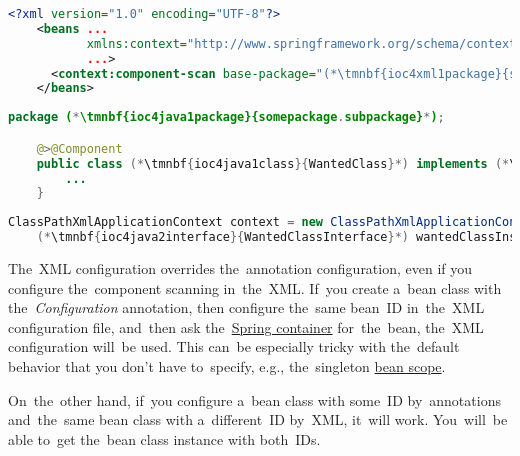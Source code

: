 \begin{lstlisting}[language=XML, title={Configuration XML}]
    <?xml version="1.0" encoding="UTF-8"?>
    <beans ...
           xmlns:context="http://www.springframework.org/schema/context"
           ...>
      <context:component-scan base-package="(*\tmnbf{ioc4xml1package}{somepackage.subpackage}[ForestGreen]*)"/>
    </beans>
\end{lstlisting}
\begin{lstlisting}[language=Java, title={Wanted class}]
    package (*\tmnbf{ioc4java1package}{somepackage.subpackage}*);

    @>@Component
    public class (*\tmnbf{ioc4java1class}{WantedClass}*) implements (*\tmnbf{ioc4java1interface}{WantedClassInterface}*) {
        ...
    }
\end{lstlisting}
\begin{lstlisting}[language=Java, title={Usage}]
    ClassPathXmlApplicationContext context = new ClassPathXmlApplicationContext("configurationFile.xml");
    (*\tmnbf{ioc4java2interface}{WantedClassInterface}*) wantedClassInstance = context.getBean("(*\tmnbf{ioc4java2beanid}{wantedClass}[ForestGreen]*)", (*\tmnbf{ioc4java2interface2}{WantedClassInterface}*).class);
\end{lstlisting}

\warningnonl The~XML configuration overrides the~annotation configuration, even if you configure the~component scanning in~the~XML\@.
If~you create a~bean class with the~\textit{Configuration} annotation, then configure the~same bean~ID in~the~XML configuration file, and~then ask the~\hyperref[springcontainrer]{Spring container} for~the~bean, the~XML configuration will~be used.
This can~be especially tricky with the~default behavior that you don't have to~specify, e.g., the~singleton \hyperref[beanscope]{bean scope}.

On~the~other hand, if~you configure a~bean class with some~ID by~annotations and~the~same bean class with a~different~ID by~XML, it~will work.
You~will~be able to~get the~bean class instance with both~IDs.

